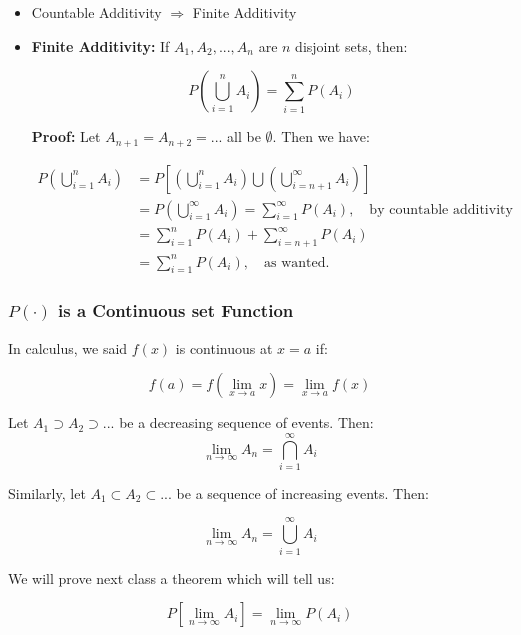 \documentclass{article}
\begin{document}
\begin{itemize}
    \item Countable Additivity $\Rightarrow$ Finite Additivity
    
    \item \textbf{Finite Additivity:} If $A_1, A_2,...,A_n$ are $n$ disjoint sets, then:
    
    \begin{equation*}
         P\left(\bigcup\limits_{i=1}^{n} A_{i}\right) = \sum\limits_{i=1}^n P(A_i)
    \end{equation*}
    
    \textbf{Proof:} Let $A_{n+1} = A_{n+2} = ...$ all be $\emptyset$. Then we have:
    
    \begin{equation*}
    \begin{split}
         P\left(\bigcup\limits_{i=1}^{n} A_{i}\right) &= P\left[\left(\bigcup\limits_{i=1}^{n} A_{i}\right) \bigcup \left(\bigcup\limits_{i=n+1}^{\infty} A_{i}\right)\right]\\
         &= P\left(\bigcup\limits_{i=1}^{\infty} A_{i}\right) = \sum\limits_{i=1}^\infty P(A_i), \quad \text{by countable additivity}\\
         &= \sum\limits_{i=1}^n P(A_i) + \sum\limits_{i=n+1}^\infty P(A_i)\\
         &= \sum\limits_{i=1}^n P(A_i), \quad \text{as wanted.}
    \end{split}
    \end{equation*}
\end{itemize}

\subsubsection{$P(\cdot)$ is a Continuous set Function}

In calculus, we said $f(x)$ is continuous at $x=a$ if:

\begin{equation*}
f(a) = f\left(\lim_{x\to a} x\right) = \lim_{x\to a} f(x)    
\end{equation*}

\noindent Let $A_1 \supset A_2 \supset ...$ be a decreasing sequence of events. Then:
\begin{equation*}
    \lim_{n\to\infty} A_n = \bigcap\limits_{i=1}^\infty A_i
\end{equation*}

\noindent Similarly, let $A_1 \subset A_2 \subset ...$ be a sequence of increasing events. Then:

\begin{equation*}
    \lim_{n\to\infty} A_n = \bigcup\limits_{i=1}^\infty A_i
\end{equation*}

\noindent We will prove next class a theorem which will tell us:

\begin{equation*}
    P\left[ \lim_{n\to\infty} A_i \right] = \lim_{n\to\infty} P(A_i)
\end{equation*}
\end{document}
